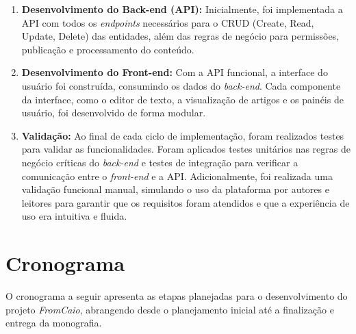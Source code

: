 \begin{enumerate}
    \item \textbf{Desenvolvimento do Back-end (API):} Inicialmente, foi implementada a API com todos os \textit{endpoints} necessários para o CRUD (Create, Read, Update, Delete) das entidades, além das regras de negócio para permissões, publicação e processamento do conteúdo.
    \item \textbf{Desenvolvimento do Front-end:} Com a API funcional, a interface do usuário foi construída, consumindo os dados do \textit{back-end}. Cada componente da interface, como o editor de texto, a visualização de artigos e os painéis de usuário, foi desenvolvido de forma modular.
    \item \textbf{Validação:} Ao final de cada ciclo de implementação, foram realizados testes para validar as funcionalidades. Foram aplicados testes unitários nas regras de negócio críticas do \textit{back-end} e testes de integração para verificar a comunicação entre o \textit{front-end} e a API. Adicionalmente, foi realizada uma validação funcional manual, simulando o uso da plataforma por autores e leitores para garantir que os requisitos foram atendidos e que a experiência de uso era intuitiva e fluida.
\end{enumerate}

\section{Cronograma}

O cronograma a seguir apresenta as etapas planejadas para o desenvolvimento do projeto \textit{FromCaio}, abrangendo desde o planejamento inicial até a finalização e entrega da monografia.

